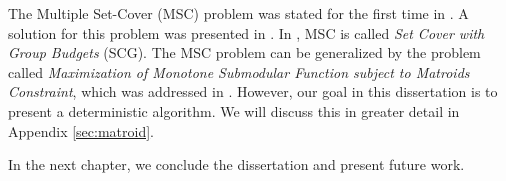 The Multiple Set-Cover (MSC) problem was stated for the first time in \cite{Elkin2003}. A solution for this problem
was presented in \cite{Chekuri2004}. 
In \cite{Chekuri2004}, MSC is called \emph{Set Cover with Group Budgets} (SCG). 
The MSC problem can be generalized by the problem called \emph{Maximization of Monotone 
Submodular Function subject to Matroids Constraint}, which was addressed in \cite{Calinescu2011}. 
However, our goal in this dissertation is to present a deterministic algorithm. 
We will discuss this in greater detail in Appendix \ref{sec:matroid}. 

In the next chapter, we conclude the dissertation and present future work.
